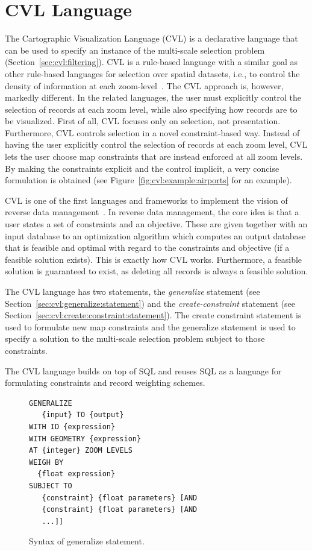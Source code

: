 \documentclass[11pt, oneside]{report}
\begin{document}
{\section{CVL Language}
\label{sec:cvl:language}
The Cartographic Visualization Language (CVL) is a declarative language that can be used to specify an instance of the multi-scale selection problem (Section~\ref{sec:cvl:filtering}). CVL is a rule-based language with a similar goal as other rule-based languages for selection over spatial datasets, i.e., to control the density of information at each zoom-level~\cite{sld,mapnik}. The CVL approach is, however, markedly different. In the related languages, the user must explicitly control the selection of records at each zoom level, while also specifying how records are to be visualized. First of all, CVL focuses only on selection, not presentation. Furthermore, CVL controls selection in a novel constraint-based way. Instead of having the user explicitly control the selection of records at each zoom level, CVL lets the user choose map constraints that are instead enforced at all zoom levels. By making the constraints explicit and the control implicit, a very concise formulation is obtained (see Figure~\ref{fig:cvl:example:airports} for an example).

CVL is one of the first languages and frameworks to implement the vision of reverse data management~\cite{meliou2011reverse}. In reverse data management, the core idea is that a user states a set of constraints and an objective. These are given together with an input database to an optimization algorithm which computes an output database that is feasible and optimal with regard to the constraints and objective (if a feasible solution exists). This is exactly how CVL works. Furthermore, a feasible solution is guaranteed to exist, as deleting all records is always a feasible solution.

The CVL language has two statements, the \emph{generalize} statement (see Section~\ref{sec:cvl:generalize:statement}) and the \emph{create-constraint} statement (see Section~\ref{sec:cvl:create:constraint:statement}). The create constraint statement is used to formulate new map constraints and the generalize statement is used to specify a solution to the multi-scale selection problem subject to those constraints.

The CVL language builds on top of SQL and reuses SQL as a language for formulating constraints and record weighting schemes.

\begin{figure}[!t]
\begin{center}
\begin{lstlisting}
GENERALIZE 
   {input} TO {output}
WITH ID {expression}
WITH GEOMETRY {expression}
AT {integer} ZOOM LEVELS
WEIGH BY
  {float expression}
SUBJECT TO 
   {constraint} {float parameters} [AND
   {constraint} {float parameters} [AND
   ...]]
\end{lstlisting}
\vspace*{-1ex}
\caption{Syntax of generalize statement.}
\label{fig:cvl:generalize:syntax}
\end{center}
\vspace*{-4ex}
\end{figure}

}
\end{document}
